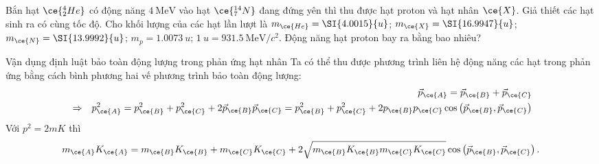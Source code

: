 \begin{vd}
Bắn hạt $\ce{^4_2He}$ có động năng $\SI{4}{\mega\electronvolt}$ vào hạt $\ce{^{14}_7N}$ đang đứng yên thì thu được hạt proton và hạt nhân $\ce{X}$. Giả thiết các hạt sinh ra có cùng tốc độ. Cho khối lượng của các hạt lần lượt là $m_{\ce{He}}=\SI{4.0015}{u}$; $m_{\ce{X}}=\SI{16.9947}{u}$; $m_{\ce{N}}=\SI{13.9992}{u}$; $m_p=\SI{1.0073}{u}$; $\SI{1}{u}=\SI{931.5}{\mega\electronvolt/c^2}$. Động năng hạt proton bay ra bằng bao nhiêu?
\end{vd}
\begin{dang}{Vận dụng định luật bảo toàn động lượng trong phản ứng hạt nhân}
	Ta có thể thu được phương trình liên hệ động năng các hạt trong phản ứng bằng cách bình phương hai vế phương trình bảo toàn động lượng:
	\begin{eqnarray*}
		&&\vec{p}_{\ce{A}}=\vec{p}_{\ce{B}}+\vec{p}_{\ce{C}}\\
		&\Rightarrow& p^2_{\ce{A}}=p^2_{\ce{B}}+p^2_{\ce{C}}+2\vec{p}_{\ce{B}}\vec{p}_{\ce{C}}=p^2_{\ce{B}}+p^2_{\ce{C}}+2p_{\ce{B}}p_{\ce{C}}\cos\left(\vec{p}_{\ce{B}},\vec{p}_{\ce{C}}\right)\\
	\end{eqnarray*}	
	Với $p^2=2mK$ thì
	$$m_{\ce{A}}K_{\ce{A}}=m_{\ce{B}}K_{\ce{B}}+m_{\ce{C}}K_{\ce{C}}+2\sqrt{m_{\ce{B}}K_{\ce{B}}m_{\ce{C}}K_{\ce{C}}}\cos\left(\vec{p}_{\ce{B}},\vec{p}_{\ce{C}}\right).$$
	\end{dang}
